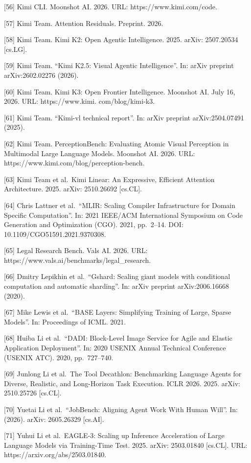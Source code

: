 {[}56{]} Kimi CLI. Moonshot AI. 2026. URL: https://www.kimi.com/code.

{[}57{]} Kimi Team. Attention Residuals. Preprint. 2026.

{[}58{]} Kimi Team. Kimi K2: Open Agentic Intelligence. 2025. arXiv:
2507.20534 {[}cs.LG{]}.

{[}59{]} Kimi Team. ``Kimi K2.5: Visual Agentic Intelligence''. In:
arXiv preprint arXiv:2602.02276 (2026).

{[}60{]} Kimi Team. Kimi K3: Open Frontier Intelligence. Moonshot AI.
July 16, 2026. URL: https://www.kimi. com/blog/kimi-k3.

{[}61{]} Kimi Team. ``Kimi-vl technical report''. In: arXiv preprint
arXiv:2504.07491 (2025).

{[}62{]} Kimi Team. PerceptionBench: Evaluating Atomic Visual Perception
in Multimodal Large Language Models. Moonshot AI. 2026. URL:
https://www.kimi.com/blog/perception-bench.

{[}63{]} Kimi Team et al.~Kimi Linear: An Expressive, Efficient
Attention Architecture. 2025. arXiv: 2510.26692 {[}cs.CL{]}.

{[}64{]} Chris Lattner et al.~``MLIR: Scaling Compiler Infrastructure
for Domain Specific Computation''. In: 2021 IEEE/ACM International
Symposium on Code Generation and Optimization (CGO). 2021, pp.~2--14.
DOI: 10.1109/CGO51591.2021.9370308.

{[}65{]} Legal Research Bench. Vals AI. 2026. URL:
https://www.vals.ai/benchmarks/legal\_research.

{[}66{]} Dmitry Lepikhin et al.~``Gshard: Scaling giant models with
conditional computation and automatic sharding''. In: arXiv preprint
arXiv:2006.16668 (2020).

{[}67{]} Mike Lewis et al.~``BASE Layers: Simplifying Training of Large,
Sparse Models''. In: Proceedings of ICML. 2021.

{[}68{]} Huiba Li et al.~``DADI: Block-Level Image Service for Agile and
Elastic Application Deployment''. In: 2020 USENIX Annual Technical
Conference (USENIX ATC). 2020, pp.~727--740.

{[}69{]} Junlong Li et al.~The Tool Decathlon: Benchmarking Language
Agents for Diverse, Realistic, and Long-Horizon Task Execution. ICLR
2026. 2025. arXiv: 2510.25726 {[}cs.CL{]}.

{[}70{]} Yuetai Li et al.~``JobBench: Aligning Agent Work With Human
Will''. In: (2026). arXiv: 2605.26329 {[}cs.AI{]}.

{[}71{]} Yuhui Li et al.~EAGLE-3: Scaling up Inference Acceleration of
Large Language Models via Training-Time Test. 2025. arXiv: 2503.01840
{[}cs.CL{]}. URL: https://arxiv.org/abs/2503.01840.

